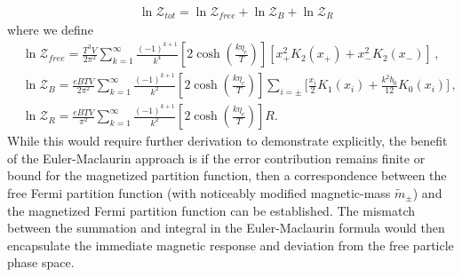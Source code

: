 \documentclass[Universe,article,submit,moreauthors,pdftex]{Definitions/mdpi}
\begin{document}
\begin{align}
&\ln\mathcal{Z}_{tot}=\ln\mathcal{Z}_{free}+\ln\mathcal{Z}_B+\ln\mathcal{Z}_R
\end{align}
where we define 
\begin{align}
  \label{FreePart}&\ln\mathcal{Z}_{free}=\frac{T^3V}{2\pi^2}\sum^{\infty}_{k=1}\frac{(-1)^{k+1}}{k^4}\left[2\cosh{\left(\frac{k\eta_{e}}{T}\right)}\right]\left[x_+^2K_2\left(x_+\right)+x_-^2K_2\left(x_-\right)\right]\,,\\
  \label{MagPart}&\ln\mathcal{Z}_B=\frac{eBTV}{2\pi^2}\sum^{\infty}_{k=1}\frac{(-1)^{k+1}}{k^2}\left[2\cosh{\left(\frac{k\eta_{e}}{T}\right)}\right]\sum_{i=\pm}\bigg[\frac{x_i}{2}K_1\left(x_i\right)+\frac{k^2b_0}{12}K_0\left(x_i\right)\bigg]\,,\\
  \label{ErrorPart}&\ln\mathcal{Z}_R=\frac{eBTV}{\pi^2}\sum^{\infty}_{k=1}\frac{(-1)^{k+1}}{k^2}\left[2\cosh{\left(\frac{k\eta_{e}}{T}\right)}\right]R.
\end{align}
While this would require further derivation to demonstrate explicitly, the benefit of the Euler-Maclaurin approach is if the error contribution remains finite or bound for the magnetized partition function, then a correspondence between the free Fermi partition function (with noticeably modified magnetic-mass $\tilde{m}_{\pm}$) and the magnetized Fermi partition function can be established. The mismatch between the summation and integral in the Euler-Maclaurin formula would then encapsulate the immediate magnetic response and deviation from the free particle phase space.
\end{document}
